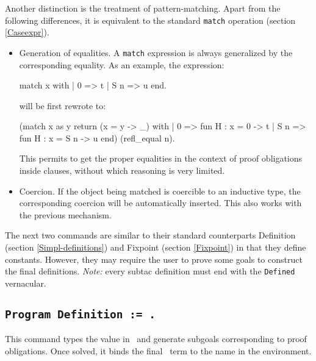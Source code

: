 Another distinction is the treatment of pattern-matching. Apart from the
following differences, it is equivalent to the standard {\tt match}
operation (section \ref{Caseexpr}).
\begin{itemize}
\item Generation of equalities. A {\tt match} expression is always
  generalized by the corresponding equality. As an example,
  the expression: 

\begin{coq_example*}
  match x with
  | 0 => t
  | S n => u
  end.
\end{coq_example*}
will be first rewrote to:
\begin{coq_example*}
  (match x as y return (x = y -> _) with
  | 0 => fun H : x = 0 -> t
  | S n => fun H : x = S n -> u
  end) (refl_equal n).
\end{coq_example*}
  
  This permits to get the proper equalities in the context of proof
  obligations inside clauses, without which reasoning is very limited.
  
\item Coercion. If the object being matched is coercible to an inductive
  type, the corresponding coercion will be automatically inserted. This also
  works with the previous mechanism.
\end{itemize}

The next two commands are similar to their standard counterparts
Definition (section \ref{Simpl-definitions}) and Fixpoint (section \ref{Fixpoint}) in that
they define constants. However, they may require the user to prove some
goals to construct the final definitions. {\em Note:} every subtac
definition must end with the {\tt Defined} vernacular.

\subsection{\tt Program Definition {\ident} := {\term}.
  \label{ProgramDefinition}}

This command types the value {\term} in \Russell\ and generate subgoals
corresponding to proof obligations. Once solved, it binds the final
\Coq\ term to the name {\ident} in the environment.

\begin{ErrMsgs}
\item {}
\end{ErrMsgs}

